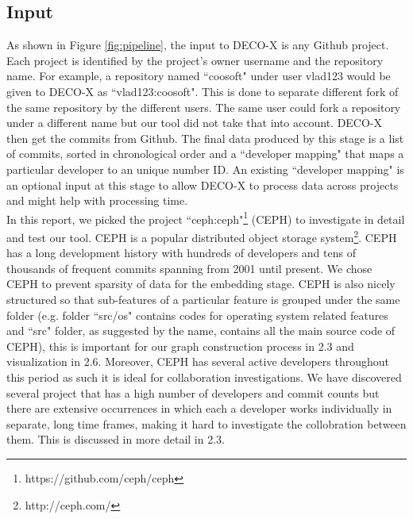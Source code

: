 \documentclass{article}
\begin{document}
\subsection{Input}
As shown in Figure \ref{fig:pipeline}, the input to DECO-X is any Github project. Each project is identified by the project's owner username and the repository name. For example, a repository named ``coosoft" under user vlad123 would be given to DECO-X as ``vlad123:coosoft". This is done to separate different fork of the same repository by the different users. The same user could fork a repository under a different name but our tool did not take that into account. DECO-X then get the commits from Github. The final data produced by this stage is a list of commits, sorted in chronological order and a ``developer mapping" that maps a particular developer to an unique number ID. An existing ``developer mapping" is an optional input at this stage to allow DECO-X to process data across projects and might help with processing time.\\
In this report, we picked the project ``ceph:ceph"\footnote{https://github.com/ceph/ceph} (CEPH) to investigate in detail and test our tool. CEPH is a popular distributed object storage system\footnote{http://ceph.com/}. CEPH has a long development history with hundreds of developers and tens of thousands of frequent commits spanning from 2001 until present. We chose CEPH to prevent sparsity of data for the embedding stage. CEPH is also nicely structured so that sub-features of a particular feature is grouped under the same folder (e.g. folder ``src/os" contains codes for operating system related features and ``src" folder, as suggested by the name, contains all the main source code of CEPH), this is important for our graph construction process in 2.3 and visualization in 2.6. Moreover, CEPH has several active developers throughout this period as such it is ideal for collaboration investigations. We have discovered several project that has a high number of developers and commit counts but there are extensive occurrences in which each a developer works individually in separate, long time frames, making it hard to investigate the collobration between them. This is discussed in more detail in 2.3.
\end{document}
